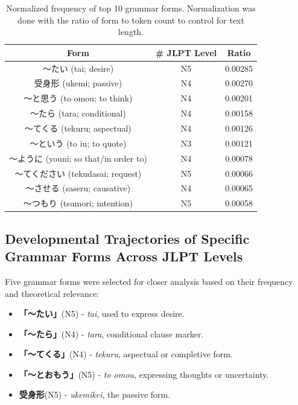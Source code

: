 \begin{table}[h!]
\centering
\begin{tabular}{ccc}
\hline \textbf{Form} & \textbf{\# JLPT Level} & \textbf{Ratio} \\ \hline
〜たい (tai; desire)                      & N5 & 0.00285 \\
受身形 (ukemi; passive)                  & N4 & 0.00270 \\
〜と思う (to omou; to think)             & N4 & 0.00201 \\
〜たら (tara; conditional)               & N4 & 0.00158 \\
〜てくる (tekuru; aspectual)             & N4 & 0.00126 \\
〜という (to iu; to quote)               & N3 & 0.00121 \\
〜ように (youni; so that/in order to)    & N4 & 0.00078 \\
〜てください (tekudasai; request)        & N5 & 0.00066 \\
〜させる (saseru; causative)             & N4 & 0.00065 \\
〜つもり (tsumori; intention)            & N5 & 0.00058 \\
\hline
\end{tabular}
\caption[Top 10 Grammar forms by normalized token ratio extracted from the I-JAS Corpus]{Normalized frequency of top
10 grammar forms. Normalization was done with the ratio of form to token count to control for text length. }
\label{tab:CF-form-freq-ratio}
\end{table}

\subsection{Developmental Trajectories of Specific Grammar Forms Across JLPT Levels}

Five grammar forms were selected for closer analysis based on their frequency and theoretical relevance:

\begin{itemize}
\item \textbf{「〜たい」}(N5) - \textit{tai}, used to express desire.
\item \textbf{「〜たら」}(N4) - \textit{tara}, conditional clause marker.
\item \textbf{「〜てくる」}(N4) - \textit{tekuru}, aspectual or completive form.
\item \textbf{「〜とおもう」}(N5) - \textit{to omou}, expressing thoughts or uncertainty.
\item \textbf{受身形}(N5) - \textit{ukemikei}, the passive form.
\end{itemize}

